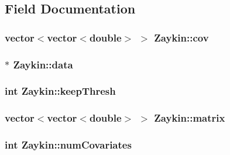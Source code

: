\subsection{Field Documentation}
\hypertarget{classZaykin_a7ab5edcff9494a41aef72ce33926bcb4}{
\subsubsection[{cov}]{\setlength{\rightskip}{0pt plus 5cm}vector$<$vector$<$double$>$ $>$ {\bf Zaykin::cov}}}
\label{classZaykin_a7ab5edcff9494a41aef72ce33926bcb4}
\hypertarget{classZaykin_a08bb927fb1ddebabaa02cfc3fe3c21b2}{
\subsubsection[{data}]{$\ast$ {\bf Zaykin::data}}}
\label{classZaykin_a08bb927fb1ddebabaa02cfc3fe3c21b2}
\hypertarget{classZaykin_aae179a8aaed20ab73b219763a8bd8495}{
\subsubsection[{keepThresh}]{\setlength{\rightskip}{0pt plus 5cm}int {\bf Zaykin::keepThresh}}}
\label{classZaykin_aae179a8aaed20ab73b219763a8bd8495}
\hypertarget{classZaykin_ad86108c46b3feda98fd722146df86cec}{
\subsubsection[{matrix}]{\setlength{\rightskip}{0pt plus 5cm}vector$<$vector$<$double$>$ $>$ {\bf Zaykin::matrix}}}
\label{classZaykin_ad86108c46b3feda98fd722146df86cec}
\hypertarget{classZaykin_ad0b5f025c5cffe4ef14f1685e956faa5}{
\subsubsection[{numCovariates}]{\setlength{\rightskip}{0pt plus 5cm}int {\bf Zaykin::numCovariates}}}
